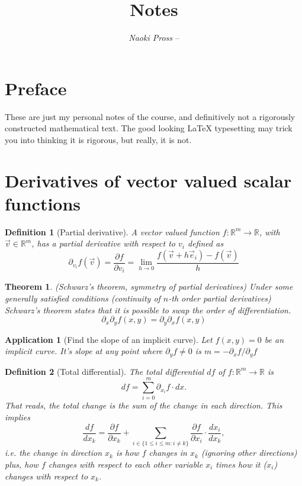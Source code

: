 \documentclass[twocolumn, margin=normal]{tex/hsrzf}
\author{\textsl{Naoki Pross} -- \texttt{\theauthoremail}}
\title{\texttt{\themodule} Notes}
\date{\thesemester}
\theoremstyle{fuvarzf}
\newtheorem{theorem}{Theorem}
\newtheorem{application}{Application}
\newtheorem{definition}{Definition}
\begin{document}
\maketitle

\section{Preface}

These are just my personal notes of the \themodule{} course, and definitively
not a rigorously constructed mathematical text. The good looking \LaTeX{}
typesetting may trick you into thinking it is rigorous, but really, it is not.

\section{Derivatives of vector valued scalar functions}

\begin{definition}[Partial derivative]
  A vector valued function \(f: \mathbb{R}^m\to\mathbb{R}\), with
  \(\vec{v}\in\mathbb{R}^m\), has a partial derivative with respect to \(v_i\)
  defined as
  \[
    \partial_{v_i} f(\vec{v})
      = \frac{\partial f}{\partial v_i}
      = \lim_{h\to 0} \frac{f(\vec{v} + h\vec{e}_i) - f(\vec{v})}{h}
  \]
\end{definition}

\begin{theorem}(Schwarz's theorem, symmetry of partial derivatives)
  Under some generally satisfied conditions (continuity of \(n\)-th order
  partial derivatives) Schwarz's theorem states that it is possible to swap
  the order of differentiation.
  \[
    \partial_x \partial_y f(x,y) = \partial_y \partial_x f(x,y)
  \]
\end{theorem}

\begin{application}[Find the slope of an implicit curve]
  Let \(f(x,y) = 0\) be an implicit curve. It's slope at any point where
  \(\partial_y f \neq 0\) is \(m = - \partial_x f / \partial_y f\)
\end{application}

\begin{definition}[Total differential]
  The total differential \(df\) of \(f:\mathbb{R}^m\to\mathbb{R}\) is
  \[
    df = \sum_{i=0}^m \partial_{x_i} f\cdot dx .
  \]
  That reads, the \emph{total} change is the sum of the change in each
  direction. This implies
  \[
    \frac{df}{dx_k} = \frac{\partial f}{\partial x_k} + 
      \sum_{i \in \{1 \leq i \leq m : i \neq k\}}
      \frac{\partial f}{\partial x_i} \cdot \frac{dx_i}{dx_k} ,
  \]
  i.e. the change in direction \(x_k\) is how \(f\) changes in \(x_k\)
  (ignoring other directions) plus, how \(f\) changes with respect to each
  other variable \(x_i\) times how it (\(x_i\)) changes with respect to \(x_k\).
\end{definition}
\end{document}
